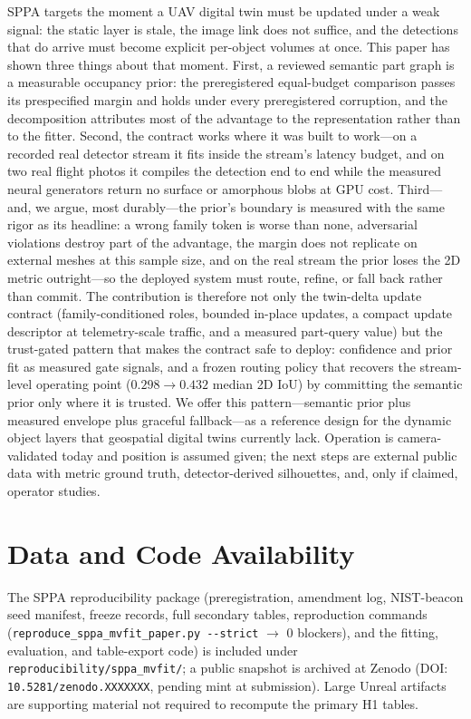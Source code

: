 \documentclass[11pt,a4paper]{article}
\begin{document}
SPPA targets the moment a UAV digital twin must be updated under a
weak signal: the static layer is stale, the image link does not
suffice, and the detections that do arrive must become explicit per-object
volumes at once. This paper has shown three things about that moment. First,
a reviewed semantic part graph is a measurable occupancy prior: the
preregistered equal-budget comparison passes its prespecified margin and
holds under every preregistered corruption, and the decomposition attributes
most of the advantage to the representation rather than to the fitter. Second, the
contract works where it was built to work---on a recorded real detector
stream it fits inside the stream's latency budget, and on two real flight
photos it compiles the detection end to end while
the measured neural generators return no surface or amorphous blobs at GPU
cost. Third---and, we argue, most durably---the
prior's boundary is measured with the same rigor as its headline: a wrong
family token is worse
than none, adversarial violations destroy part of the advantage, the
margin does not replicate on external meshes at
this sample size, and on the real stream the prior loses the 2D metric
outright---so the deployed system must route, refine, or fall back rather
than commit. The contribution is therefore not only the twin-delta update
contract (family-conditioned roles, bounded in-place updates, a compact
update descriptor at telemetry-scale traffic, and a measured part-query
value) but the trust-gated pattern that makes the contract safe to deploy:
confidence and prior fit as measured gate signals, and a frozen routing
policy that recovers the stream-level operating point
(\(0.298\to0.432\) median 2D IoU) by committing the semantic prior only
where it is trusted. We offer this pattern---semantic prior plus measured
envelope plus graceful fallback---as a reference design for the dynamic
object layers that geospatial digital twins currently lack. Operation is
camera-validated today and position is assumed given;
the next steps are
external public data with metric ground truth, detector-derived silhouettes,
and, only if claimed, operator studies.

\section*{Data and Code Availability}

{\sloppy
The SPPA reproducibility package (preregistration,
amendment log, NIST-beacon seed manifest, freeze
records, full secondary tables, reproduction commands
(\texttt{reproduce\_sppa\_mvfit\_paper.py -{}-strict} \(\to\) 0 blockers),
and the fitting, evaluation, and table-export code) is
included under
\texttt{reproducibility/\allowbreak sppa\_mvfit/}; a public snapshot is
archived at
Zenodo (DOI: \texttt{10.5281/zenodo.XXXXXXX}, pending mint at submission).
Large Unreal artifacts are supporting material not required to
recompute the primary H1 tables.
\par}
\end{document}
